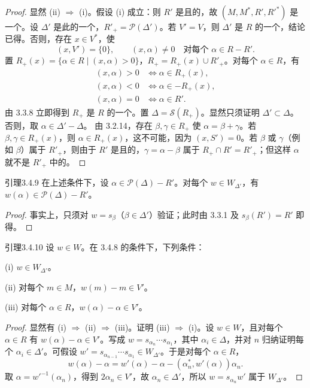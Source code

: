 \begin{proof}
显然 (ii) $\Rightarrow$ (i)。假设 (i) 成立：则 $R'$ 是且的，故 $(M,M^*,R',R'^*)$ 是一个。设 $\Delta'$ 是此的一个，$R'_+=\mathscr P(\Delta')$。若 $V'=V$，则 $\Delta'$ 是 $R$ 的一个，结论已得。否则，存在 $x\in V^*$，使
\[(x,V')=\{0\},\qquad(x,\alpha)\ne0\quad\text{对每个 }\alpha\in R-R'.\]
置 $R_+(x)=\{\alpha\in R\mid(x,\alpha)>0\}$，$R_+=R_+(x)\cup R'_+$。对每个 $\alpha\in R$，有
\begin{align*}
(x,\alpha)>0&\Longleftrightarrow\alpha\in R_+(x),\\
(x,\alpha)<0&\Longleftrightarrow\alpha\in-R_+(x),\\
(x,\alpha)=0&\Longleftrightarrow\alpha\in R'.
\end{align*}
由 3.3.8 立即得到 $R_+$ 是 $R$ 的一个。置 $\Delta=\mathscr S(R_+)$。显然只须证明 $\Delta'\subset\Delta$。否则，取 $\alpha\in\Delta'-\Delta$。
由 3.2.14，存在 $\beta,\gamma\in R_+$ 使 $\alpha=\beta+\gamma$。若 $\beta,\gamma\in R_+(x)$，则 $\alpha\in R_+(x)$，这不可能，因为 $(x,S')=0$。若 $\beta$ 或 $\gamma$（例如 $\beta$）属于 $R'_+$，则由于 $R'$ 是且的，$\gamma=\alpha-\beta$ 属于 $R_+\cap R'=R'_+$；但这样 $\alpha$ 就不是 $R'_+$ 中的。
\end{proof}
\begin{SGAresult}{引理}{3.4.9}
在上述条件下，设 $\alpha\in\mathscr P(\Delta)-R'$。对每个 $w\in W_{\Delta'}$，有 $w(\alpha)\in\mathscr P(\Delta)-R'$。
\end{SGAresult}
\begin{proof}
事实上，只须对 $w=s_\beta$（$\beta\in\Delta'$）验证；此时由 3.3.1 及 $s_\beta(R')=R'$ 即得。
\end{proof}
\begin{SGAresult}{引理}{3.4.10}
设 $w\in W$。在 3.4.8 的条件下，下列条件：

(i) $w\in W_{\Delta'}$。

(ii) 对每个 $m\in M$，$w(m)-m\in V'$。

(iii) 对每个 $\alpha\in R$，$w(\alpha)-\alpha\in V'$。
\end{SGAresult}
\begin{proof}
显然有 (i) $\Rightarrow$ (ii) $\Rightarrow$ (iii)。证明 (iii) $\Rightarrow$ (i)。设 $w\in W$，且对每个 $\alpha\in R$ 有 $w(\alpha)-\alpha\in V'$。写成 $w=s_{\alpha_n}\cdots s_{\alpha_1}$，其中 $\alpha_i\in\Delta$，并对 $n$ 归纳证明每个 $\alpha_i\in\Delta'$。可假设 $w'=s_{\alpha_{n-1}}\cdots s_{\alpha_1}\in W_{\Delta'}$。于是对每个 $\alpha\in R$，
\[w(\alpha)-\alpha=w'(\alpha)-\alpha-(\alpha_n^*,w'(\alpha))\alpha_n.\]
取 $\alpha=w'^{-1}(\alpha_n)$，得到 $2\alpha_n\in V'$，故 $\alpha_n\in\Delta'$，所以 $w=s_{\alpha_n}w'$ 属于 $W_{\Delta'}$。
\end{proof}

